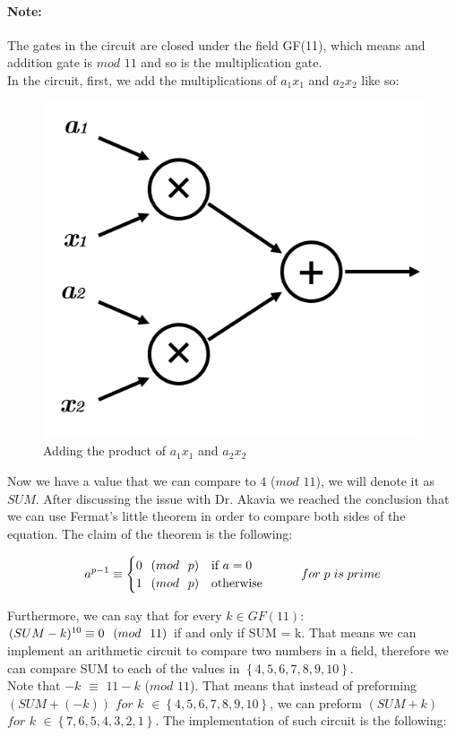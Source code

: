 \documentclass{article}
\begin{document}
\paragraph{Note:} The gates in the circuit are closed under the field GF(11), which means and addition gate is $mod$ $11$ and so is the multiplication gate.
\\In the circuit, first, we add the multiplications of $a_1x_1$ and $a_2x_2$ like so:
\begin{figure}[H]
    \centering
    \includegraphics[width=.5\linewidth]{arithcirc.png}
    \caption{Adding the product of $a_1x_1$ and $a_2x_2$}
    \label{fig:enter-label}
\end{figure}

Now we have a value that we can compare to $4$ ($mod$ $11$), we will denote it as $SUM$. After discussing the issue with Dr. Akavia we reached the conclusion that we can use Fermat's little theorem in order to compare both sides of the equation. The claim of the theorem is the following:

$$
a^{p-1}  \equiv\begin{cases}
			0 \hspace{.25cm} (mod \hspace{.25cm}p) & \text{if $a = 0$}\\
            1 \hspace{.25cm} (mod \hspace{.25cm}p) & \text{otherwise}
		 \end{cases} \hspace{1cm} for \hspace{.1cm}  p \hspace{.1cm}is \hspace{.1cm}prime
$$

Furthermore, we can say that for every $k \in GF(11)$:
\\
$(SUM-k)^{10} \equiv 0 \hspace{.25cm} (mod \hspace{.25cm} 11)$
if and only if SUM = k. That means we can implement an arithmetic circuit to compare two numbers in a field, therefore we can compare SUM to each of the values in $\left\{ 4,5,6,7,8,9,10\right\}$. 
\\Note that $-k$ $\equiv$ $11-k$ ($mod$ $11$). That means that instead of preforming $(SUM + (-k))$ $for$ $k$ $\in \left\{ 4,5,6,7,8,9,10\right\}$, we can preform $(SUM + k)$\\ $for$ $k$ $\in \left\{ 7,6,5,4,3,2,1\right\}$. The implementation of such circuit is the following:
\end{document}
